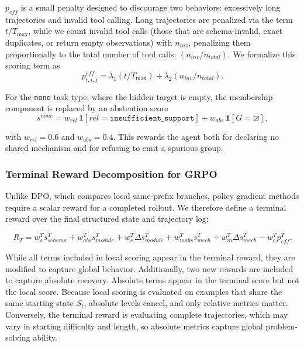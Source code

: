 \documentclass[thesis,letterpaper,12pt]{utthesis}
\begin{document}
$p_{eff}$ is a small penalty designed to discourage two behaviors: excessively long trajectories and invalid tool calling. Long trajectories are penalized via the term $t / T_{\max}$, while we count invalid tool calls (those that are schema-invalid, exact duplicates, or return empty observations) with $n_{inv}$, penalizing them proportionally to the total number of tool calls: $(n_{inv} / n_{total})$. We formalize this scoring term as
\begin{equation}\label{eqn:eff-pen}
    p^{eff}_{t,i,j} = \lambda_1 (t / T_{\max}) + \lambda_2(n_{inv} / n_{total}).
\end{equation}

For the \texttt{none} task type, where the hidden target is empty, the membership component is replaced by an abstention score
\[
    s^{none} = w_{rel}\, \mathbf{1}[rel = \texttt{insufficient\_support}] + w_{abs}\, \mathbf{1}[G = \varnothing],
\]

with $w_{rel} = 0.6$ and $w_{abs} = 0.4$. This rewards the agent both for declaring no shared mechanism and for refusing to emit a spurious group.

\subsubsection{Terminal Reward Decomposition for GRPO}\label{sec:terminal-reward}
Unlike DPO, which compares local same-prefix branches, policy gradient methods require a scalar reward for a completed rollout. We therefore define a terminal reward over the final structured state and trajectory log:

\begin{equation}\label{eqn:terminal-reward}
    R_T = w^T_s s^T_{schema} +w^T_{abs} s^{T}_{module} + w^T_{c} \Delta s^{T}_{module} + w^T_{mabs} s^T_{mech} + w^T_{m} \Delta s^{T}_{mech} - w^T_e p^{T}_{eff}. 
\end{equation}

While all terms included in local scoring appear in the terminal reward, they are modified to capture global behavior. Additionally, two new rewards are included to capture absolute recovery. Absolute terms appear in the terminal score but not the local score. Because local scoring is evaluated on examples that share the same starting state $S_t$, absolute levels cancel, and only relative metrics matter. Conversely, the terminal reward is evaluating complete trajectories, which may vary in starting difficulty and length, so absolute metrics capture global problem-solving ability.
\end{document}
